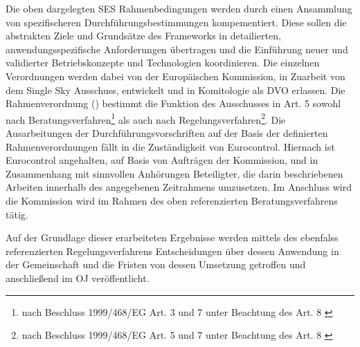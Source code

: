 \label{ch:ir}

Die oben dargelegten \ac{SES} Rahmenbedingungen werden durch einen Ansammlung von spezifischeren Durchführungsbestimmungen kompementiert.
Diese sollen die abstrakten Ziele und Grundsätze des Frameworks in detailierten, anwendungsspezifische Anforderungen übertragen und die Einführung neuer und validierter Betriebskonzepte und Technologien koordinieren. \cite[22]{baf_iop}
Die einzelnen  Verordnungen werden dabei von der Europäischen Kommission, in Zuarbeit von dem Single Sky Ausschuss, entwickelt und in Komitologie als \acf{DVO} erlassen.
Die Rahmenverordnung () bestimmt die Funktion des Ausschusses in Art. 5 sowohl nach Beratungsverfahren\footnote{nach Beschluss 1999/468/EG Art. 3 und 7 unter Beachtung des Art. 8 \cite{31999D0468}} als auch nach Regelungsverfahren\footnote{nach Beschluss 1999/468/EG Art. 5 und 7 unter Beachtung des Art. 8 \cite{31999D0468}}.
Die Ausarbeitungen der Durchführungsvorschriften auf der Basis der definierten Rahmenverordnungen \cite[Art. 3]{2004R0549} fällt in die Zuständigkeit von Eurocontrol. 
Hiernach ist Eurocontrol angehalten, auf Basis von Aufträgen der Kommission, und in Zusammenhang mit sinnvollen Anhörungen Beteiligter, die darin beschriebenen Arbeiten innerhalb des angegebenen Zeitrahmens umzusetzen. 
Im Anschluss wird die Kommission wird im Rahmen des oben referenzierten Beratungsverfahrens tätig.
\cite[Art. 8. Abs. 1]{2004R0549}

Auf der Grundlage dieser erarbeiteten Ergebnisse werden mittels des ebenfalss referenzierten Regelungsverfahrens Entscheidungen über dessen Anwendung in der Gemeinschaft und die Fristen von dessen Umsetzung getroffen und anschließend im \ac{OJ} veröffentlicht.
\cite[Art. 8 Abs. 2]{2004R0549}




